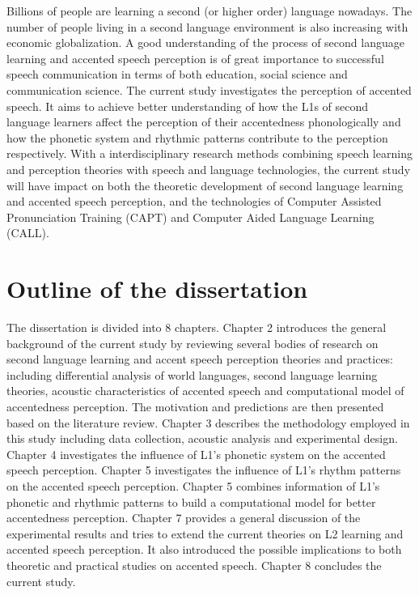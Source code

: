 Billions of people are learning a second (or higher order) language nowadays. The number of people living in a second language environment is also increasing with economic globalization. A good understanding of the process of second language learning and accented speech perception is of great importance to successful speech communication in terms of both education, social science and communication science. The current study investigates the perception of accented speech. It aims to achieve better understanding of how the L1s of second language learners affect the perception of their accentedness phonologically and how the phonetic system and rhythmic patterns contribute to the perception respectively. With a interdisciplinary research methods combining speech learning and perception theories with speech and language technologies, the current study will have impact on both the theoretic development of second language learning and accented speech perception, and the technologies of Computer Assisted Pronunciation Training (CAPT) and Computer Aided Language Learning (CALL).

\section{Outline of the dissertation}

The dissertation is divided into 8 chapters. Chapter 2 introduces the general background of the current study by reviewing several bodies of research on second language learning and accent speech perception theories and practices: including differential analysis of world languages, second language learning theories, acoustic characteristics of accented speech and computational model of accentedness perception. The motivation and predictions are then presented based on the literature review. Chapter 3 describes the methodology employed in this study including data collection, acoustic analysis and experimental design. Chapter 4 investigates the influence of L1's phonetic system on the accented speech perception. Chapter 5 investigates the influence of L1's rhythm patterns on the accented speech perception. Chapter 5 combines information of L1's phonetic and rhythmic patterns to build a computational model for better accentedness perception. Chapter 7 provides a general discussion of the experimental results and tries to extend the current theories on L2 learning and accented speech perception. It also introduced the possible implications to both theoretic and practical studies on accented speech. Chapter 8 concludes the current study.



